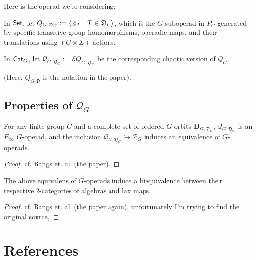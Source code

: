\documentclass{article}
\begin{document}
\hfil

Here is the operad we're considering:

\begin{defn}
    In $\mathsf{Set}$, let $Q_{G,\mathfrak{D}_G}:= \langle \otimes_T\ |\ T\in \mathfrak{D}_G \rangle$, which is the $G$-suboperad in $P_G$ generated by specific transitive group homomorphisms, operadic maps, and their translations using $(G\times\Sigma)$-actions. 

    In $\mathsf{Cat}_G$, let $\mathscr{Q}_{G,\mathfrak{D}_G}:= \mathscr{E}Q_{G,\mathfrak{D}_G}$ be the corresponding chaotic version of $Q_G$.
\end{defn}

(Here, $Q_{G,\mathfrak{D}}$ is the notation in the paper).

\hfil

\subsection{Properties of $\mathscr{Q}_G$}

\begin{thm}
    For any finite group $G$ and a complete set of ordered $G$-orbits $\mathbf{D}_{G,\mathfrak{D}_G}$, $\mathscr{Q}_{G,\mathfrak{D}_G}$ is an $E_\infty$ $G$-operad, and the inclusion $\mathscr{Q}_{G,\mathfrak{D}_G}\hookrightarrow \mathscr{P}_G$ induces an equivalence of $G$-operads.
\end{thm}
\begin{proof}
    cf. Bangs et. al. (the paper).
\end{proof}

\hfil

\begin{thm}
    The above equivalens of $G$-operads induce a biequivalence between their respective 2-categories of algebras and lax maps.
\end{thm}
\begin{proof}
    cf. Bangs et. al. (the paper again), unfortunately I'm trying to find the original source, 
\end{proof}



\newpage

\section{References}
\end{document}
